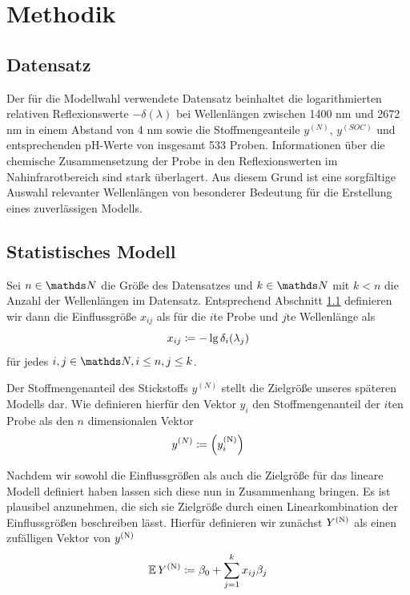 \section{Methodik}
\label{sec:Methodik}

	\subsection{Datensatz}
	\label{ssec:Datensatz}

	    Der für die Modellwahl verwendete Datensatz beinhaltet die logarithmierten relativen Reflexionswerte $-\delta(\lambda)$ bei Wellenlängen zwischen 1400 nm und 2672 nm in einem Abstand von 4 nm sowie die Stoffmengeanteile $y^{(N)}$, $y^{(SOC)}$ und entsprechenden pH-Werte von insgesamt 533 Proben.
	    Informationen über die chemische Zusammensetzung der Probe in den Reflexionswerten im Nahinfrarotbereich sind stark überlagert. \cite{Agelet2010}
	    Aus diesem Grund ist eine sorgfältige Auswahl relevanter Wellenlängen von besonderer Bedeutung für die Erstellung eines zuverlässigen Modells.



	\subsection{Statistisches Modell}
	\label{ssec:Statistisches Modell}

	    Sei $n\in\SN$ die Größe des Datensatzes und $k\in\SN$ mit $k< n$ die Anzahl der Wellenlängen im Datensatz.
	    Entsprechend Abschnitt \ref{ssec:Datensatz} definieren wir dann die Einflussgröße $x_{ij}$ als für die $i$te Probe und $j$te Wellenlänge als
	    \[
			x_{ij} \coloneqq -\lg \delta_i(\lambda_j)
		\]
		für jedes $i,j\in\SN,i\leq n,j\leq k$.

	    Der Stoffmengenanteil des Stickstoffs  $y^{(N)}$ stellt die Zielgröße unseres späteren Modells dar.
	    Wie definieren hierfür den Vektor $y_i$ den Stoffmengenanteil der $i$ten Probe als den $n$ dimensionalen Vektor
		\[
			 y^{(N)} \coloneqq \left( y^{\mathrm{(N)}}_i \right)
		\]

        Nachdem wir sowohl die Einflussgrößen als auch die Zielgröße für das lineare Modell definiert haben lassen sich diese nun in Zusammenhang bringen.
        Es ist plausibel anzunehmen, die sich sie Zielgröße durch einen Linearkombination der Einflussgrößen beschreiben lässt.
        Hierfür definieren wir zunächst $Y^{\mathrm{(N)}}$ als einen zufälligen Vektor von $y^{\mathrm{(N)}}$
        \[
			 \operatorname{\mathbb{E}} Y^{\mathrm{(N)}} \coloneqq \beta_0 + \sum_{j=1}^k{x_{ij}\beta_j}
		\]

